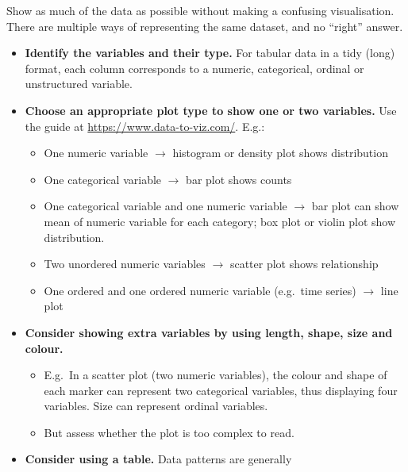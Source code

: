 \documentclass[10pt]{article}
\newlength{\calloutparindent}
\newenvironment{callout}[2][standard]{
  \setlength{\calloutparindent}{\parindent}
  \begin{tcolorbox}[enhanced jigsaw,
    leftrule=.15mm, toprule=.15mm,
    colframe=quarto-callout-#1-color-frame, opacityback=0,
    colback=white, coltitle=black, rightrule=.15mm, breakable,
    colbacktitle=quarto-callout-#1-color!50!white,
    opacitybacktitle=0.6, titlerule=0mm, left=1mm,right=1mm,
    title=\textcolor{quarto-callout-#1-color}{\expandafter\csname
      quartocallout#1icon\endcsname}{\textbf{#2}},
    drop shadow,
    bottomrule=.15mm, toptitle=1mm, arc=.35mm, bottomtitle=1mm,
    before=\par\medskip]%
    \setlength{\parindent}{\calloutparindent}\noindent\ignorespaces}%
  {\end{tcolorbox}}
\newcommand{\principle}[3]{\begin{callout}{#1}\raggedright#2\tcblower\raggedright#3\end{callout}}
\begin{document}
\begin{multicols}{3}
  \principle{Principle 1: Show the data}%
  {Show as much of the data as possible without making a confusing
    visualisation. There are multiple ways of representing the same
    dataset, and no ``right'' answer.}%
{\begin{itemize}[itemsep=1ex]
\item \textbf{Identify the variables and their type.} For tabular data
  in a tidy (long) format, each column corresponds to a numeric,
  categorical, ordinal or unstructured variable.
\item
  \textbf{Choose an appropriate plot type to show one or two
    variables.}
  Use the guide at \url{https://www.data-to-viz.com/}. E.g.:
  \begin{itemize}[topsep=0pt]
  \item One numeric variable $\rightarrow$ histogram or density plot
    shows distribution
  \item One categorical variable $\rightarrow$ bar plot
    shows counts
  \item One categorical variable and one numeric variable
    $\rightarrow$ bar plot can show mean of numeric variable for each
    category; box plot or violin plot show distribution.
  \item Two unordered numeric variables $\rightarrow$ scatter plot
    shows relationship
  \item One ordered and one ordered numeric variable (e.g.~time series)
    $\rightarrow$ line plot
  \end{itemize}
\item
  \textbf{Consider showing extra variables by using length, shape,
    size and colour.}
  \begin{itemize}
  \item E.g.~In a scatter plot (two numeric variables), the colour and
    shape of each marker can represent two categorical variables, thus
    displaying four variables. Size can represent ordinal variables.
  \item But assess whether the plot is too complex to read.
  \end{itemize}
\item \textbf{Consider using a table.} Data patterns are generally

\end{itemize}}
\end{multicols}
\end{document}
